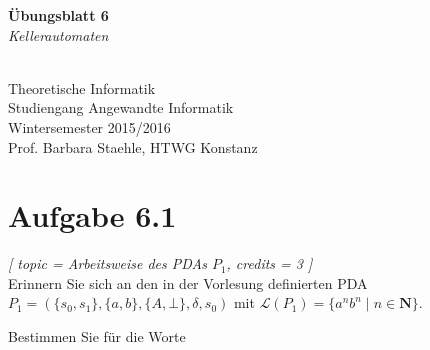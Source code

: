 \documentclass[12pt]{article}
\def \nat {\mathbf{N}}
\begin{document}
  
\begin{center}
\begin{huge}
\textbf{Übungsblatt 6}\\
\textit{Kellerautomaten}
\end{huge} \\

Theoretische Informatik\\
Studiengang Angewandte Informatik\\
Wintersemester 2015/2016\\
Prof. Barbara Staehle, HTWG Konstanz
\end{center}

\section*{Aufgabe 6.1}

\textit{[ 
 topic = Arbeitsweise des PDAs $P_1$, 
 credits = 3 
 ] }
  \\
 Erinnern Sie sich an den in der Vorlesung definierten PDA \\ $P_1 = (\{s_0, s_1\}, \{a,b\}, \{A, \bot\}, \delta, s_0)$ mit $\mathcal{L}(P_1) = \{a^nb^n \mid n \in \nat \}$. 
  
 Bestimmen Sie für die Worte  
  
\end{document}
